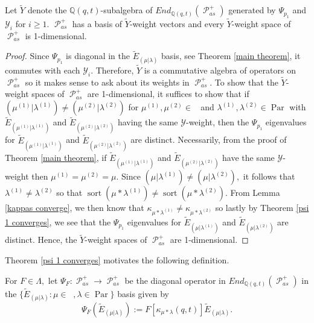 \documentclass[ALCO,Unicode]{cedram}
\newcommand{\y}{{ \mathscr{Y} }}
\DeclareMathOperator{\sP}{\mathscr{P} }
\DeclareMathOperator{\sort}{sort}
\DeclareMathOperator{\Par}{\mathrm{Par}}
\DeclareMathOperator{\Compred}{\mathrm{Comp}^{\textit{red}}}
\begin{document}
\begin{thm}\label{second main theorem}
    Let $\widetilde{Y}$ denote the $\mathbb{Q}(q,t)$-subalgebra of $End_{\mathbb{Q}(q,t)}(\sP_{as}^{+})$ generated by $\Psi_{p_1}$ and $\y_i$ for $i \geq 1$. $\sP_{as}^{+}$ has a basis of $\widetilde{Y}$-weight vectors and every $\widetilde{Y}$-weight space of $\sP_{as}^{+}$ is 1-dimensional.
\end{thm}
\begin{proof}
Since $\Psi_{p_1}$ is diagonal in the $\widetilde{E}_{(\mu|\lambda)}$ basis, see Theorem \ref{main theorem}, it commutes with each $\y_i$. Therefore, $\widetilde{Y}$ is a commutative algebra of operators on $\sP_{as}^{+}$ so it makes sense to ask about its weights in $\sP_{as}^{+}$. To show that the $\widetilde{Y}$-weight spaces of $\sP_{as}^{+}$ are 1-dimensional, it suffices to show that if $(\mu^{(1)}|\lambda^{(1)}) \neq (\mu^{(2)}|\lambda^{(2)})$ for $\mu^{(1)},\mu^{(2)} \in \Compred$ and $\lambda^{(1)},\lambda^{(2)} \in \Par$ with $\widetilde{E}_{(\mu^{(1)}|\lambda^{(1)})}$ and $\widetilde{E}_{(\mu^{(2)}|\lambda^{(2)})}$ having the same $\y$-weight, then the $\Psi_{p_1}$ eigenvalues for $\widetilde{E}_{(\mu^{(1)}|\lambda^{(1)})}$ and $\widetilde{E}_{(\mu^{(2)}|\lambda^{(2)})}$ are distinct. Necessarily, from the proof of Theorem \ref{main theorem}, if $\widetilde{E}_{(\mu^{(1)}|\lambda^{(1)})}$ and $\widetilde{E}_{(\mu^{(2)}|\lambda^{(2)})}$ have the same $\y$-weight then $\mu^{(1)} = \mu^{(2)} = \mu$. Since $(\mu|\lambda^{(1)}) \neq (\mu|\lambda^{(2)}),$ it follows that $\lambda^{(1)} \neq \lambda^{(2)}$ so that $\sort(\mu*\lambda^{(1)}) \neq \sort(\mu*\lambda^{(2)} )$. From Lemma \ref{kappas converge}, we then know that $\kappa_{\mu*\lambda^{(1)}} \neq \kappa_{\mu*\lambda^{(2)}}$ so lastly by Theorem \ref{psi 1 converges}, we see that the $\Psi_{p_1}$ eigenvalues for $\widetilde{E}_{(\mu|\lambda^{(1)})}$ and $\widetilde{E}_{(\mu|\lambda^{(2)})}$ are distinct. Hence, the $\widetilde{Y}$-weight spaces of $\sP_{as}^{+}$ are 1-dimensional.
\end{proof}



Theorem \ref{psi 1 converges} motivates the following definition.

\begin{defi}
    For $F \in \Lambda,$ let $\Psi_{F}: \sP_{as}^{+} \rightarrow \sP_{as}^{+}$ be the diagonal operator in $End_{\mathbb{Q}(q,t)}(\sP_{as}^{+})$ in the $\{\widetilde{E}_{(\mu|\lambda)}: \mu \in \Compred, \lambda \in \Par\}$ basis given by 
    \begin{equation}
        \Psi_{F}(\widetilde{E}_{(\mu|\lambda)}) := F[\kappa_{\mu*\lambda}(q,t)]\widetilde{E}_{(\mu|\lambda)}.
    \end{equation}
\end{defi}
\end{document}
